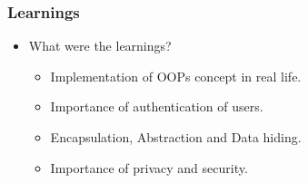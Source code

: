 \documentclass[12pt]{beamer}
\begin{document}

\begin{frame}
    \frametitle{Learnings}
    \begin{itemize}          
        \item What were the learnings?
             \begin{itemize}
             \item { Implementation of OOPs concept in real life. }
             \item { Importance of authentication of users. }
             \item { Encapsulation, Abstraction and Data hiding. }
             \item { Importance of privacy and security. } 
             \end{itemize}
             
       
    \end{itemize}       
\end{frame}
\end{document}
